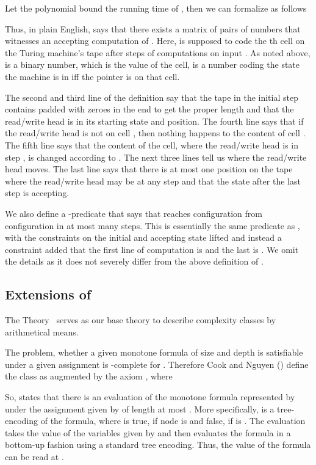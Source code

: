 \documentclass{LMCS}
\begin{document}
Let the polynomial  bound the running time of , then we can formalize  as follows




\noindent Thus, in plain English,  says that there exists a matrix  of pairs of numbers that
witnesses an accepting computation of . Here,  is supposed to
code the th cell on the Turing machine's tape after  steps of computations on input . As noted above,
 is a binary number, which is the value of the cell,  is a number coding the state the machine is in iff the pointer is on that
cell.

The second and third line of the definition say that the tape in the initial step contains  padded with
zeroes in the end to get the proper length  and that the read/write head is in its starting state
and position. The fourth line says that if the read/write head is not on cell , then nothing happens to the
content of cell . The fifth line says that the content of the cell, where the read/write head is in step ,
is changed according to . The next three lines tell us where the read/write head moves. The last line
says that there is at most one position on the tape where the read/write head may be at any step and that the
state after the last step is accepting.

We also define a -predicate  that says that  reaches configuration 
from configuration  in at most  many steps. This is essentially the same predicate as
, with the constraints on the initial and accepting state lifted and instead a constraint added
that the first line of computation is  and the last is . We omit the details as it does not severely
differ from the above definition of .




\subsection{Extensions of \VZ}\label{Sec:Ext of VZ}

The Theory \VZ\ serves as our base theory to describe complexity classes by arithmetical means.

The problem, whether a given monotone formula  of size  and depth  is
satisfiable under a given assignment  is -complete for . Therefore Cook and
Nguyen (\cite{CN10}) define the class  as  augmented by the axiom , where

So,  states that there is an evaluation  of the monotone formula represented by  under the assignment
given by  of length at most . More specifically,  is a tree-encoding of the formula, where  is
true, if node  is  and false, if  is . The evaluation  takes the value of the variables
given by  and then evaluates the formula in a bottom-up fashion using a standard tree encoding. Thus, the
value of the formula can be read at .
\end{document}
